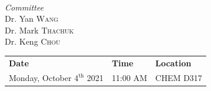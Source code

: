 \begin{titlepage}
	\vspace{1cm}
	
	~
	\begin{minipage}{0.4\textwidth}
		\begin{center}
			\large
			\textit{Committee}\\
			Dr. Yan \textsc{Wang}\\ %
			Dr. Mark \textsc{Thachuk}\\ %
			Dr. Keng \textsc{Chou} %
		\end{center}
	\end{minipage}
	
	
	\vfill\vfill\vfill %
	
	{\large
	\begin{table}[H]
		\centering
		\begin{tabular}{lll}
			\textbf{Date} & \textbf{Time} & \textbf{Location} \\
			Monday, October 4$^{\text{th}}$ 2021 & 11:00 AM & CHEM D317
		\end{tabular}
	\end{table}
	}
	
	 
	
	\vfill %
	
\end{titlepage}


